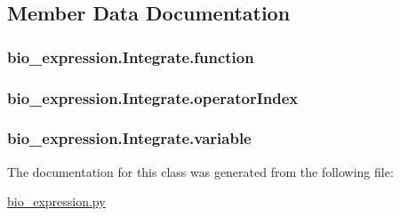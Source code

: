\subsection{Member Data Documentation}
\hypertarget{classbio__expression_1_1_integrate_aa0b26e5e7ef188bddbbbac6d2734eb1e}{
\subsubsection[{function}]{\setlength{\rightskip}{0pt plus 5cm}bio\+\_\+expression.\+Integrate.\+function}}\label{classbio__expression_1_1_integrate_aa0b26e5e7ef188bddbbbac6d2734eb1e}
\hypertarget{classbio__expression_1_1_integrate_ae6f4e73d2daf792fc223e12b205c4904}{
\subsubsection[{operator\+Index}]{\setlength{\rightskip}{0pt plus 5cm}bio\+\_\+expression.\+Integrate.\+operator\+Index}}\label{classbio__expression_1_1_integrate_ae6f4e73d2daf792fc223e12b205c4904}
\hypertarget{classbio__expression_1_1_integrate_a8aa2ae870cce644d72a76ecae5497121}{
\subsubsection[{variable}]{\setlength{\rightskip}{0pt plus 5cm}bio\+\_\+expression.\+Integrate.\+variable}}\label{classbio__expression_1_1_integrate_a8aa2ae870cce644d72a76ecae5497121}


The documentation for this class was generated from the following file\+:\begin{DoxyCompactItemize}
\item 
\hyperlink{bio__expression_8py}{bio\+\_\+expression.\+py}\end{DoxyCompactItemize}
